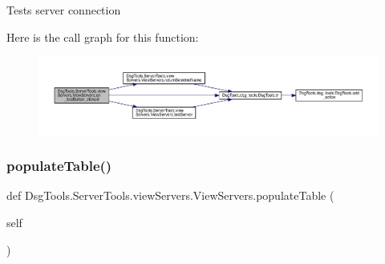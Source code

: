 \begin{DoxyVerb}Tests server connection
\end{DoxyVerb}
 Here is the call graph for this function\+:
\nopagebreak
\begin{figure}[H]
\begin{center}
\leavevmode
\includegraphics[width=350pt]{class_dsg_tools_1_1_server_tools_1_1view_servers_1_1_view_servers_a778e3427c24e845df98c73689e392997_cgraph}
\end{center}
\end{figure}
\mbox{\label{class_dsg_tools_1_1_server_tools_1_1view_servers_1_1_view_servers_a4d8ffeccd0a84daebc1d311d028ae7cb}} 
\subsubsection{\texorpdfstring{populate\+Table()}{populateTable()}}
{\footnotesize\ttfamily def Dsg\+Tools.\+Server\+Tools.\+view\+Servers.\+View\+Servers.\+populate\+Table (\begin{DoxyParamCaption}\item[{}]{self }\end{DoxyParamCaption})}

